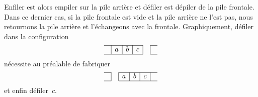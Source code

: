 Enfiler est alors empiler sur la pile arrière et défiler est dépiler de la pile frontale. Dans ce dernier cas, si la pile frontale est vide et la pile arrière ne l'est pas, nous retournons la pile arrière et l'échangeons avec la frontale. Graphiquement, défiler dans la configuration
\begin{equation*}
\begin{array}{c|c|c|c|c|c} \cline{1-4}\cline{6-6} & a & b & c &
&\\ \cline{1-4}\cline{6-6}
\end{array}
\end{equation*}
nécessite au préalable de fabriquer
\begin{equation*}
\begin{array}{c|c|c|c|c|c}
  \cline{1-1}\cline{3-6}
  & & a & b & c &\\
  \cline{1-1}\cline{3-6}
\end{array}
\end{equation*}
et enfin défiler~\(c\).

